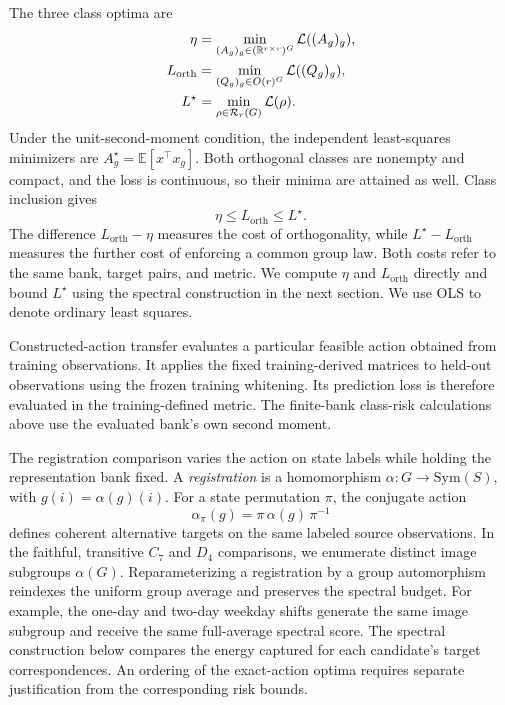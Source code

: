 The three class optima are
\[
 \begin{aligned}
 \eta
   &=\min_{(A_g)_g\in(\mathbb{R}^{r\times r})^G}
       \mathcal L((A_g)_g),\\
 L_{\mathrm{orth}}
   &=\min_{(Q_g)_g\in O(r)^G}
       \mathcal L((Q_g)_g),\\
 L^\star
   &=\min_{\rho\in\mathcal R_r(G)}
       \mathcal L(\rho).
 \end{aligned}
\]
Under the unit-second-moment condition, the independent
least-squares minimizers are
$A_g^\star=\mathbb E[x^\top x_g]$.
Both orthogonal classes are nonempty and compact, and the
loss is continuous, so their minima are attained as well.
Class inclusion gives
\[
 \eta\le L_{\mathrm{orth}}\le L^\star.
\]
The difference $L_{\mathrm{orth}}-\eta$ measures the cost
of orthogonality, while $L^\star-L_{\mathrm{orth}}$
measures the further cost of enforcing a common group law.
Both costs refer to the same bank, target pairs, and metric.
We compute $\eta$ and $L_{\mathrm{orth}}$ directly and
bound $L^\star$ using the spectral construction in the
next section.
We use OLS to denote ordinary least squares.

Constructed-action transfer evaluates a particular feasible
action obtained from training observations.
It applies the fixed training-derived matrices to held-out
observations using the frozen training whitening.
Its prediction loss is therefore evaluated in the
training-defined metric.
The finite-bank class-risk calculations above use the
evaluated bank's own second moment.

The registration comparison varies the action on state
labels while holding the representation bank fixed.
A \emph{registration} is a homomorphism
$\alpha:G\to\mathrm{Sym}(S)$, with
$g(i)=\alpha(g)(i)$.
For a state permutation $\pi$, the conjugate action
\[
 \alpha_\pi(g)=\pi\,\alpha(g)\,\pi^{-1}
\]
defines coherent alternative targets on the same labeled
source observations.
In the faithful, transitive $C_7$ and $D_4$ comparisons,
we enumerate distinct image subgroups $\alpha(G)$.
Reparameterizing a registration by a group automorphism
reindexes the uniform group average and preserves the
spectral budget.
For example, the one-day and two-day weekday shifts
generate the same image subgroup and receive the same
full-average spectral score.
The spectral construction below compares the energy
captured for each candidate's target correspondences.
An ordering of the exact-action optima requires separate
justification from the corresponding risk bounds.

